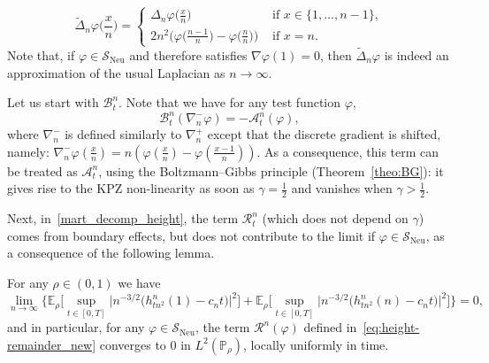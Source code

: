 \documentclass[AHL,Unicode,longabstracts]{cedram}
\DeclareMathOperator{\Neu}{Neu}
\newcommand{\bb}[1]{{\mathbb #1}}
\newcommand{\mc}[1]{{\mathcal #1}}
\renewcommand{\mc}[1]{{\mathcal #1}}
\newcommand{\SN}{\ensuremath{\mc S_{\Neu}}}
\renewcommand{\tilde}{\widetilde}
\renewcommand{\tfrac}{\frac}
\begin{document}
\begin{equation}\label{eq:lap2}
\tilde\Delta_n\varphi\big(\tfrac x n\big) =
\begin{cases}
\Delta_n\varphi \big(\tfrac x n\big) & \text{ if } x \in \{1,\dots,n-1\},\\[0.3em]
2 n^2\big(\varphi\big(\tfrac{n-1}{n}\big)-\varphi\big(\tfrac{n}{n}\big)\big) & \text{ if }x=n.
\end{cases}
\end{equation}
Note that, if $\varphi \in \SN$ and therefore satisfies $\nabla \varphi(1)=0$, then $\tilde\Delta_n\varphi$ is indeed an approximation of the usual Laplacian as $n\to\infty$.

Let us start with $\mc B_t^n$. Note that we have for any test function $\varphi$,
\[
\mc B_t^n(\nabla_n^- \varphi) = -\mc A_t^n(\varphi),
\]
where $\nabla_n^-$ is defined similarly to $\nabla_n^+$ except that the discrete gradient is shifted, namely: $ \nabla_n^-\varphi(\frac x n) = n(\varphi(\frac x n)-\varphi(\frac{x-1}{n}))$. As a consequence, this term can be treated as $\mc A_t^n$, using the Boltzmann--Gibbs principle (Theorem~\ref{theo:BG}): it gives rise to the KPZ non-linearity as soon as $\gamma=\frac12$ and vanishes when $\gamma >\frac12$.

Next, in~\eqref{mart_decomp_height}, the term $\mc R_t^n$ (which does not depend on $\gamma$) comes from boundary effects, but does not contribute to the limit if $\varphi \in \SN$, as a consequence of the following lemma.

\begin{lemm}\label{lem:height-boundary}
For any $\rho \in (0,1)$ we have
\[
\lim_{n \rightarrow \infty} \bigg\{ \mathbb{E}_\rho \bigg[\sup_{t \in [0,T]} \big| n^{- 3/2} \big(h^n_{{tn^2}} (1) - c_n t\big) \big|^2\bigg] +\mathbb{E}_\rho \bigg[\sup_{t \in [0, T]} \big| n^{- 3/2} \big(h^n_{{tn^2}} (n) - c_n t\big) \big|^2\bigg] \bigg\} = 0,
\]
and in particular, for any $\varphi \in \SN$, the term $\mc R^n(\varphi)$ defined in~\eqref{eq:height-remainder_new} converges to $0$ in $L^2(\bb P_\rho)$, locally uniformly in time.
\end{lemm}
\end{document}
